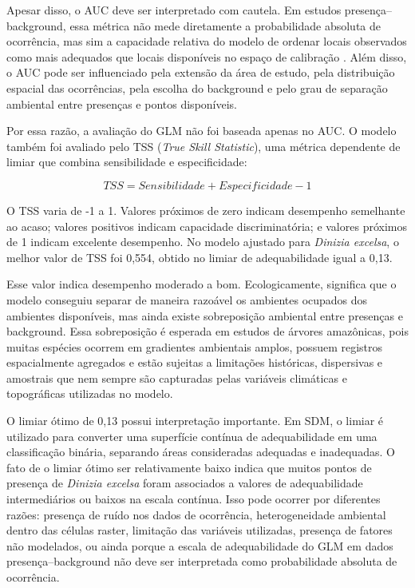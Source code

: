 Apesar disso, o AUC deve ser interpretado com cautela. Em estudos presença--background, essa métrica não mede diretamente a probabilidade absoluta de ocorrência, mas sim a capacidade relativa do modelo de ordenar locais observados como mais adequados que locais disponíveis no espaço de calibração \citep{lobo2008auc,peterson2011ecological}. Além disso, o AUC pode ser influenciado pela extensão da área de estudo, pela distribuição espacial das ocorrências, pela escolha do background e pelo grau de separação ambiental entre presenças e pontos disponíveis.

Por essa razão, a avaliação do GLM não foi baseada apenas no AUC. O modelo também foi avaliado pelo TSS (\textit{True Skill Statistic}), uma métrica dependente de limiar que combina sensibilidade e especificidade:

\begin{equation}
	TSS = Sensibilidade + Especificidade - 1
\end{equation}

O TSS varia de -1 a 1. Valores próximos de zero indicam desempenho semelhante ao acaso; valores positivos indicam capacidade discriminatória; e valores próximos de 1 indicam excelente desempenho. No modelo ajustado para \textit{Dinizia excelsa}, o melhor valor de TSS foi 0,554, obtido no limiar de adequabilidade igual a 0,13.

Esse valor indica desempenho moderado a bom. Ecologicamente, significa que o modelo conseguiu separar de maneira razoável os ambientes ocupados dos ambientes disponíveis, mas ainda existe sobreposição ambiental entre presenças e background. Essa sobreposição é esperada em estudos de árvores amazônicas, pois muitas espécies ocorrem em gradientes ambientais amplos, possuem registros espacialmente agregados e estão sujeitas a limitações históricas, dispersivas e amostrais que nem sempre são capturadas pelas variáveis climáticas e topográficas utilizadas no modelo.

O limiar ótimo de 0,13 possui interpretação importante. Em SDM, o limiar é utilizado para converter uma superfície contínua de adequabilidade em uma classificação binária, separando áreas consideradas adequadas e inadequadas. O fato de o limiar ótimo ser relativamente baixo indica que muitos pontos de presença de \textit{Dinizia excelsa} foram associados a valores de adequabilidade intermediários ou baixos na escala contínua. Isso pode ocorrer por diferentes razões: presença de ruído nos dados de ocorrência, heterogeneidade ambiental dentro das células raster, limitação das variáveis utilizadas, presença de fatores não modelados, ou ainda porque a escala de adequabilidade do GLM em dados presença--background não deve ser interpretada como probabilidade absoluta de ocorrência.

